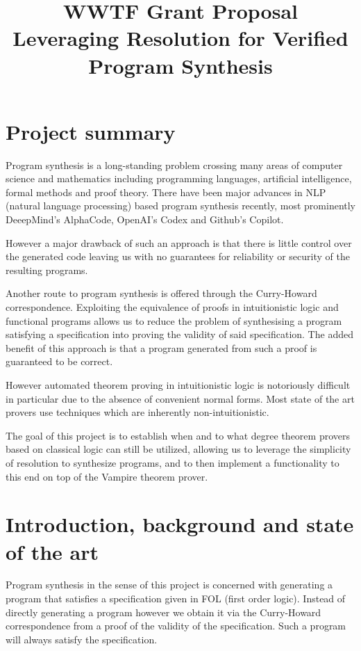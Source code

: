 \documentclass[a4paper,12pt]{article}
\title{WWTF Grant Proposal\\Leveraging Resolution for Verified Program Synthesis}
\begin{document}
	
	\maketitle
	
	\section{Project summary}
	
	Program synthesis is a long-standing problem crossing many areas of computer science and mathematics including programming languages, artificial intelligence, formal methods and proof theory. There have been major advances in NLP (natural language processing) based program synthesis recently, most prominently DeeepMind's AlphaCode, OpenAI's Codex and Github's Copilot.
	
	However a major drawback of such an approach is that there is little control over the generated code leaving us with no guarantees for reliability or security of the resulting programs.
	
	Another route to program synthesis is offered through the Curry-Howard correspondence. Exploiting the equivalence of proofs in intuitionistic logic and functional programs allows us to reduce the problem of synthesising a program satisfying a specification into proving the validity of said specification. The added benefit of this approach is that a program generated from such a proof is guaranteed to be correct.
	
	However automated theorem proving in intuitionistic logic is notoriously difficult in particular due to the absence of convenient normal forms. Most state of the art provers use techniques which are inherently non-intuitionistic.
	
	The goal of this project is to establish when and to what degree theorem provers based on classical logic can still be utilized, allowing us to leverage the simplicity of resolution to synthesize programs, and to then implement a functionality to this end on top of the Vampire theorem prover.
	
	
	\section{Introduction, background and state of the art}	
	
	Program synthesis in the sense of this project is concerned with generating a program that satisfies a specification given in FOL (first order logic). Instead of directly generating a program however we obtain it via the Curry-Howard correspondence from a proof of the validity of the specification. Such a program will always satisfy the specification.
	
\end{document}
